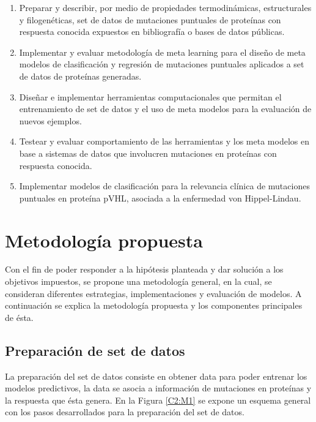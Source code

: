 \begin{enumerate}
	
	\item Preparar y describir, por medio de propiedades termodinámicas, estructurales y filogenéticas, set de datos de mutaciones puntuales de proteínas con respuesta conocida expuestos en bibliografía o bases de datos públicas.
	
	\item Implementar y evaluar metodología de meta learning para el diseño de meta modelos de clasificación y regresión de mutaciones puntuales aplicados a set de datos de proteínas generadas.
	
	\item Diseñar e implementar herramientas computacionales que permitan el entrenamiento de set de datos y el uso de meta modelos para la evaluación de nuevos ejemplos.
	
	\item Testear y evaluar comportamiento de las herramientas y los meta modelos en base a sistemas de datos que involucren mutaciones en proteínas con respuesta conocida.
	
	\item Implementar modelos de clasificación para la relevancia clínica de mutaciones puntuales en proteína pVHL, asociada a la enfermedad von Hippel-Lindau. 
	
\end{enumerate}

\section{Metodología propuesta}

Con el fin de poder responder a la hipótesis planteada y dar solución a los objetivos impuestos, se propone una metodología general, en la cual, se consideran diferentes estrategias, implementaciones y evaluación de modelos. A continuación se explica la metodología propuesta y los componentes principales de ésta.

\subsection{Preparación de set de datos}

La preparación del set de datos consiste en obtener data para poder entrenar los modelos  predictivos, la data se asocia a información de mutaciones en proteínas y la respuesta que ésta genera. En la Figura \ref{C2:M1} se expone un esquema general con los pasos desarrollados para la preparación del set de datos.

